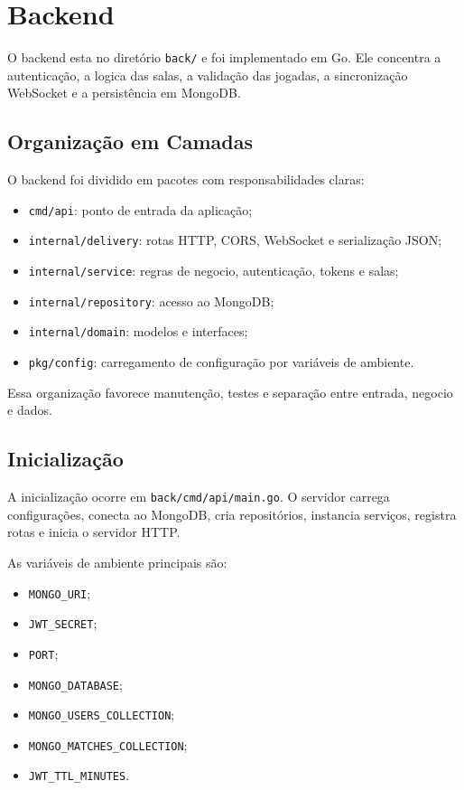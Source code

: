 \documentclass[12pt]{article}
\begin{document}
\section{Backend}

O backend esta no diretório \texttt{back/} e foi implementado em Go. Ele concentra a autenticação, a logica das salas, a validação das jogadas, a sincronização WebSocket e a persistência em MongoDB.

\subsection{Organização em Camadas}

O backend foi dividido em pacotes com responsabilidades claras:

\begin{itemize}
    \item \texttt{cmd/api}: ponto de entrada da aplicação;
    \item \texttt{internal/delivery}: rotas HTTP, CORS, WebSocket e serialização JSON;
    \item \texttt{internal/service}: regras de negocio, autenticação, tokens e salas;
    \item \texttt{internal/repository}: acesso ao MongoDB;
    \item \texttt{internal/domain}: modelos e interfaces;
    \item \texttt{pkg/config}: carregamento de configuração por variáveis de ambiente.
\end{itemize}

Essa organização favorece manutenção, testes e separação entre entrada, negocio e dados.

\subsection{Inicialização}

A inicialização ocorre em \texttt{back/cmd/api/main.go}. O servidor carrega configurações, conecta ao MongoDB, cria repositórios, instancia serviços, registra rotas e inicia o servidor HTTP.

As variáveis de ambiente principais são:

\begin{itemize}
    \item \texttt{MONGO\_URI};
    \item \texttt{JWT\_SECRET};
    \item \texttt{PORT};
    \item \texttt{MONGO\_DATABASE};
    \item \texttt{MONGO\_USERS\_COLLECTION};
    \item \texttt{MONGO\_MATCHES\_COLLECTION};
    \item \texttt{JWT\_TTL\_MINUTES}.
\end{itemize}
\end{document}
